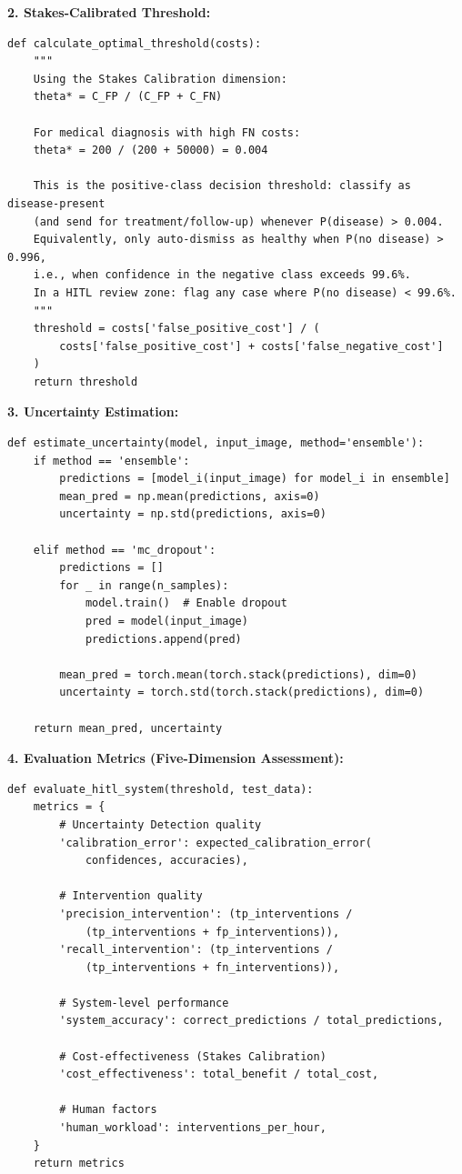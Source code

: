 \textbf{2. Stakes-Calibrated Threshold:}
\begin{lstlisting}[style=python, caption={Optimal threshold calculation}]
def calculate_optimal_threshold(costs):
    """
    Using the Stakes Calibration dimension:
    theta* = C_FP / (C_FP + C_FN)

    For medical diagnosis with high FN costs:
    theta* = 200 / (200 + 50000) = 0.004

    This is the positive-class decision threshold: classify as disease-present
    (and send for treatment/follow-up) whenever P(disease) > 0.004.
    Equivalently, only auto-dismiss as healthy when P(no disease) > 0.996,
    i.e., when confidence in the negative class exceeds 99.6%.
    In a HITL review zone: flag any case where P(no disease) < 99.6%.
    """
    threshold = costs['false_positive_cost'] / (
        costs['false_positive_cost'] + costs['false_negative_cost']
    )
    return threshold
\end{lstlisting}

\textbf{3. Uncertainty Estimation:}
\begin{lstlisting}[style=python, caption={Ensemble and MC Dropout uncertainty estimation}]
def estimate_uncertainty(model, input_image, method='ensemble'):
    if method == 'ensemble':
        predictions = [model_i(input_image) for model_i in ensemble]
        mean_pred = np.mean(predictions, axis=0)
        uncertainty = np.std(predictions, axis=0)

    elif method == 'mc_dropout':
        predictions = []
        for _ in range(n_samples):
            model.train()  # Enable dropout
            pred = model(input_image)
            predictions.append(pred)

        mean_pred = torch.mean(torch.stack(predictions), dim=0)
        uncertainty = torch.std(torch.stack(predictions), dim=0)

    return mean_pred, uncertainty
\end{lstlisting}

\textbf{4. Evaluation Metrics (Five-Dimension Assessment):}
\begin{lstlisting}[style=python, caption={HITL system evaluation}]
def evaluate_hitl_system(threshold, test_data):
    metrics = {
        # Uncertainty Detection quality
        'calibration_error': expected_calibration_error(
            confidences, accuracies),

        # Intervention quality
        'precision_intervention': (tp_interventions /
            (tp_interventions + fp_interventions)),
        'recall_intervention': (tp_interventions /
            (tp_interventions + fn_interventions)),

        # System-level performance
        'system_accuracy': correct_predictions / total_predictions,

        # Cost-effectiveness (Stakes Calibration)
        'cost_effectiveness': total_benefit / total_cost,

        # Human factors
        'human_workload': interventions_per_hour,
    }
    return metrics
\end{lstlisting}

